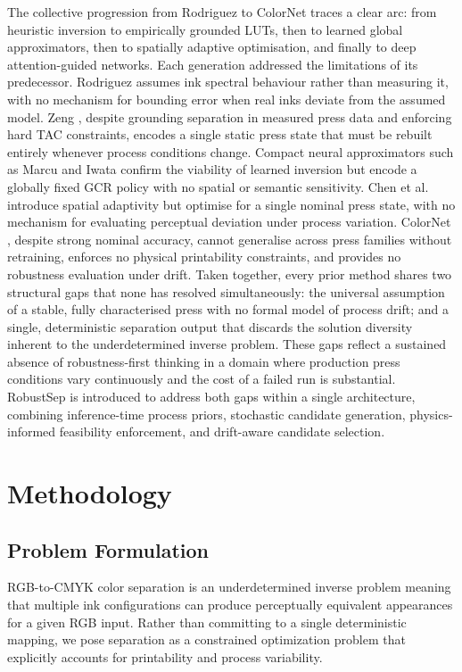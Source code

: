 \documentclass[acmsmall,screen,nonacm]{acmart}
\begin{document}
The collective progression from Rodriguez \cite{rodriguez} to ColorNet \cite{bo} traces a clear arc: from heuristic inversion to empirically grounded LUTs, then to learned global approximators, then to spatially adaptive optimisation, and finally to deep attention-guided networks. Each generation addressed the limitations of its predecessor. Rodriguez \cite{rodriguez} assumes ink spectral behaviour rather than measuring it, with no mechanism for bounding error when real inks deviate from the assumed model. Zeng \cite{zeng}, despite grounding separation in measured press data and enforcing hard TAC constraints, encodes a single static press state that must be rebuilt entirely whenever process conditions change. Compact neural approximators such as Marcu and Iwata \cite{marcu} confirm the viability of learned inversion but encode a globally fixed GCR policy with no spatial or semantic sensitivity. Chen et al.\ \cite{chen} introduce spatial adaptivity but optimise for a single nominal press state, with no mechanism for evaluating perceptual deviation under process variation. ColorNet \cite{bo}, despite strong nominal accuracy, cannot generalise across press families without retraining, enforces no physical printability constraints, and provides no robustness evaluation under drift. Taken together, every prior method shares two structural gaps that none has resolved simultaneously: the universal assumption of a stable, fully characterised press with no formal model of process drift; and a single, deterministic separation output that discards the solution diversity inherent to the underdetermined inverse problem. These gaps reflect a sustained absence of robustness-first thinking in a domain where production press conditions vary continuously and the cost of a failed run is substantial. RobustSep is introduced to address both gaps within a single architecture, combining inference-time process priors, stochastic candidate generation, physics-informed feasibility enforcement, and drift-aware candidate selection.

\section{Methodology}

\subsection{Problem Formulation}

RGB-to-CMYK color separation is an underdetermined inverse problem meaning that multiple ink configurations can produce perceptually equivalent appearances for a given RGB input. Rather than committing to a single deterministic mapping, we pose separation as a constrained optimization problem that explicitly accounts for printability and process variability.
\end{document}
